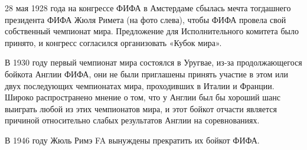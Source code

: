 28 мая 1928 года на конгрессе ФИФА в Амстердаме сбылась мечта тогдашнего президента ФИФА Жюля Римета (на фото слева), чтобы ФИФА провела свой собственный чемпионат мира. Предложение для Исполнительного комитета было принято, и конгресс согласился организовать «Кубок мира».

В 1930 году первый чемпионат мира состоялся в Уругвае, из-за продолжающегося бойкота Англии ФИФА, они не были приглашены принять участие в этом или двух последующих чемпионатах мира, проходивших в Италии и Франции. Широко распространено мнение о том, что у Англии был бы хороший шанс выиграть любой из этих чемпионатов мира, и этот бойкот отчасти является причиной относительно слабых результатов Англии на соревнованиях.


В 1946 году Жюль Римэ FA вынуждены прекратить их бойкот ФИФА.









